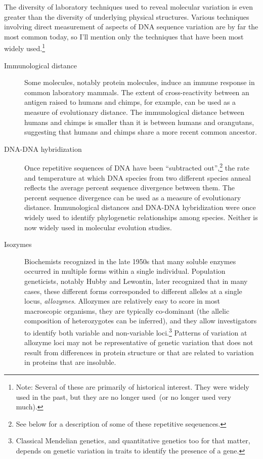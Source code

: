 The diversity of laboratory techniques used to reveal molecular
variation is even greater than the diversity of underlying physical
structures. Various techniques involving direct measurement of aspects
of DNA sequence variation are by far the most common today, so I'll
mention only the techniques that have been most widely
used.\footnote{Note: Several of these are primarily of historical
  interest. They were widely used in the past, but they are no longer
  used~(or no longer used very much).}

\begin{description}

\item[Immunological distance] Some molecules, notably protein
  molecules, induce an immune response in common laboratory
  mammals. The extent of cross-reactivity between an antigen raised to
  humans and chimps, for example, can be used as a measure of
  evolutionary distance. The immunological distance between humans and
  chimps is smaller than it is between humans and orangutans,
  suggesting that humans and chimps share a more recent common
  ancestor.

\item[DNA-DNA hybridization] Once repetitive sequences of DNA have
  been ``subtracted out'',\footnote{See below for a description of
    some of these repetitive seqeuences.} the rate and temperature at
  which DNA species from two different species anneal reflects the
  average percent sequence divergence between them. The percent
  sequence divergence can be used as a measure of evolutionary
  distance. Immunological distances and DNA-DNA hybridization were
  once widely used to identify phylogenetic relationships among
  species. Neither is now widely used in molecular evolution
  studies.

\item[Isozymes] Biochemists recognized in the late 1950s that many
  soluble enzymes occurred in multiple forms within a single
  individual. Population geneticists, notably Hubby and Lewontin, later
  recognized that in many cases, these different forms corresponded to
  different alleles at a single locus, {\it allozymes}. Allozymes are
  relatively easy to score in most macroscopic organisms, they are
  typically co-dominant (the allelic composition of heterozygotes can
  be inferred), and they allow investigators to identify both variable
  and non-variable loci.\footnote{Classical Mendelian genetics, and
    quantitative genetics too for that matter, depends on genetic
    variation in traits to identify the presence of a gene.} Patterns
  of variation at allozyme loci may not be representative of genetic
  variation that does not result from differences in protein structure
  or that are related to variation in proteins that are
  insoluble.


\end{description}
